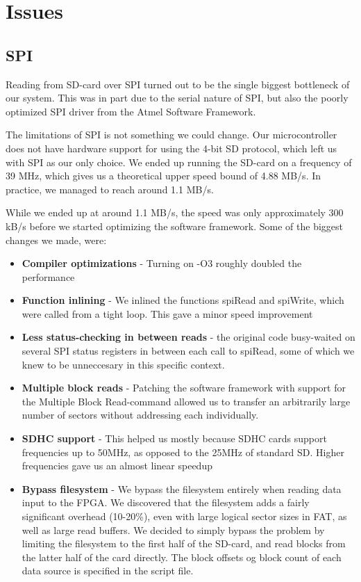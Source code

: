 \section{Issues}

\subsection{SPI}
\label{sec:avr-spi-issues}
Reading from SD-card over SPI turned out to be the single biggest bottleneck of
our system. This was in part due to the serial nature of SPI, but also the poorly optimized SPI driver from the Atmel Software Framework.

The limitations of SPI is not something we could change. Our microcontroller does not have hardware support for using the 4-bit SD protocol, which left us with SPI as our only choice. We ended up running the SD-card on a frequency of 39 MHz, which gives us a theoretical upper speed bound of 4.88 MB/s. In practice, we managed to reach around 1.1 MB/s.

While we ended up at around 1.1 MB/s, the speed was only approximately 300 kB/s before we started optimizing the software framework. Some of the biggest changes we made, were:
\begin{itemize}
	\item \textbf{Compiler optimizations} - Turning on -O3 roughly doubled the performance
	\item \textbf{Function inlining} - We inlined the functions spiRead and spiWrite, which were called from a tight loop. This gave a minor speed improvement
	\item \textbf{Less status-checking in between reads} - the original code busy-waited on several SPI status registers in between each call to spiRead, some of which we knew to be unneccesary in this specific context.
	\item \textbf{Multiple block reads} - Patching the software framework with support for the Multiple Block Read-command allowed us to transfer an arbitrarily large number of sectors without addressing each individually.
	\item \textbf{SDHC support} - This helped us mostly because SDHC cards support frequencies up to 50MHz, as opposed to the 25MHz of standard SD. Higher frequencies gave us an almost linear speedup
	\item \textbf{Bypass filesystem} - We bypass the filesystem entirely when reading data input to the FPGA. We discovered that the filesystem adds a fairly significant overhead (10-20\%), even with large logical sector sizes in FAT, as well as large read buffers. We decided to simply bypass the problem by limiting the filesystem to the first half of the SD-card, and read blocks from the latter half of the card directly. The block offsets og block count of each data source is specified in the script file.
\end{itemize}

